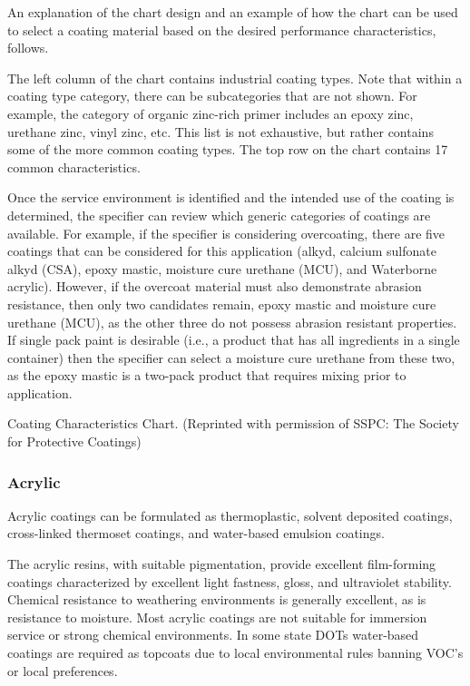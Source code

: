 An explanation of the chart design and an example of how the chart can be used to select a coating material
based on the desired performance characteristics, follows.

The left column of the chart contains industrial coating types. Note that within a coating type category, there can
be subcategories that are not shown. For example, the category of organic zinc-rich primer includes an epoxy zinc,
urethane zinc, vinyl zinc, etc. This list is not exhaustive, but rather contains some of the more common coating types.
The top row on the chart contains 17 common characteristics.

Once the service environment is identified and the intended use of the coating is determined, the specifier can
review which generic categories of coatings are available. For example, if the specifier is considering overcoating,
there are five coatings that can be considered for this application (alkyd, calcium sulfonate alkyd (CSA), epoxy
mastic, moisture cure urethane (MCU), and Waterborne acrylic). However, if the overcoat material must also
demonstrate abrasion resistance, then only two candidates remain, epoxy mastic and moisture cure urethane (MCU),
as the other three do not possess abrasion resistant properties. If single pack paint is desirable (i.e., a product that has
all ingredients in a single container) then the specifier can select a moisture cure urethane from these two, as the
epoxy mastic is a two-pack product that requires mixing prior to application.

\begin{table}
  \caption{Coating Characteristics Chart. (Reprinted with permission of SSPC: The Society for Protective Coatings)}
  \label{tab:coating-characteristics}
\end{table}


\subsubsection{Acrylic}
Acrylic coatings can be formulated as thermoplastic, solvent deposited coatings, cross-linked thermoset coatings,
and water-based emulsion coatings.

The acrylic resins, with suitable pigmentation, provide excellent film-forming coatings characterized by excellent
light fastness, gloss, and ultraviolet stability. Chemical resistance to weathering environments is generally excellent,
as is resistance to moisture. Most acrylic coatings are not suitable for immersion service or strong chemical
environments. In some state DOTs water-based coatings are required as topcoats due to local environmental rules
banning VOC’s or local preferences.

